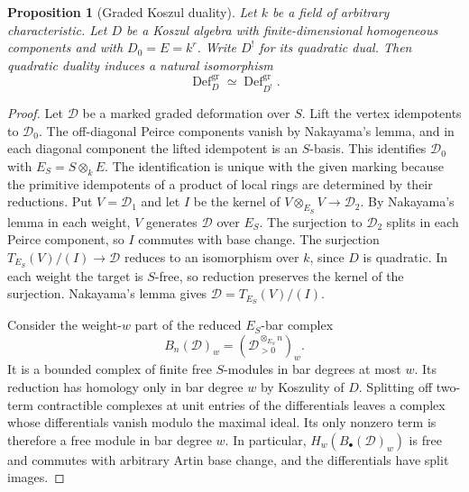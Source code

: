 \documentclass[12pt,a4paper,english,reqno]{amsart}
\numberwithin{equation}{section}
\theoremstyle{plain}
\newtheorem*{prp-nn}{Proposition}
\theoremstyle{definition}
\begin{document}
\begin{prp-nn}[Graded Koszul duality]
Let $k$ be a field of arbitrary characteristic. Let $D$ be a Koszul
algebra with finite-dimensional homogeneous components and with
$D_0=E=k^r$. Write $D^!$ for its quadratic dual. Then quadratic
duality induces a natural isomorphism
\[
 \operatorname{Def}^{\mathrm{gr}}_D
   \simeq \operatorname{Def}^{\mathrm{gr}}_{D^!}.
\]
\end{prp-nn}

\begin{proof}
Let $\mathcal D$ be a marked graded deformation over $S$. Lift the
vertex idempotents to $\mathcal D_0$. The off-diagonal Peirce
components vanish by Nakayama's lemma, and in each diagonal
component the lifted idempotent is an $S$-basis. This identifies
$\mathcal D_0$ with $E_S=S\otimes_k E$. The identification is
unique with the given marking because the primitive idempotents
of a product of local rings are determined by their reductions.
Put $V=\mathcal D_1$ and let $I$ be the kernel of
$V\otimes_{E_S}V\to\mathcal D_2$.
By Nakayama's lemma in each weight, $V$ generates $\mathcal D$
over $E_S$. The surjection to $\mathcal D_2$ splits in each
Peirce component, so $I$ commutes with base change. The
surjection $T_{E_S}(V)/(I)\to\mathcal D$ reduces to an isomorphism
over $k$, since $D$ is quadratic. In each weight the target is
$S$-free, so reduction preserves the kernel of the surjection.
Nakayama's lemma gives $\mathcal D=T_{E_S}(V)/(I)$.

Consider the weight-$w$ part of the reduced $E_S$-bar complex
\[
 B_n(\mathcal D)_w=(\mathcal D_{>0}^{\otimes_{E_S}n})_w .
\]
It is a bounded complex of finite free $S$-modules in bar degrees
at most $w$. Its reduction has homology only in bar degree $w$
by Koszulity of $D$. Splitting off two-term contractible
complexes at unit entries of the differentials leaves a
complex whose differentials vanish modulo the maximal ideal.
Its only nonzero term is therefore a free module in bar degree
$w$. In particular, $H_w(B_\bullet(\mathcal D)_w)$ is free and
commutes with arbitrary Artin base change, and the differentials
have split images.


\end{proof}
\end{document}

